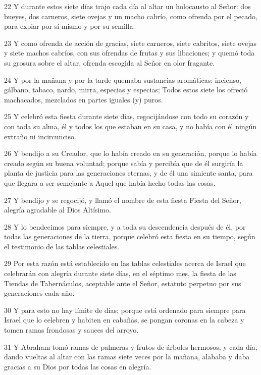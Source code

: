 \par 22 Y durante estos siete días trajo cada día al altar un holocausto al Señor: dos bueyes, dos carneros, siete ovejas y un macho cabrío, como ofrenda por el pecado, para expiar por sí mismo y por su semilla.
\par 23 Y como ofrenda de acción de gracias, siete carneros, siete cabritos, siete ovejas y siete machos cabríos, con sus ofrendas de frutas y sus libaciones; y quemó toda su grosura sobre el altar, ofrenda escogida al Señor en olor fragante.
\par 24 Y por la mañana y por la tarde quemaba sustancias aromáticas: incienso, gálbano, tabaco, nardo, mirra, especias y especias; Todos estos siete los ofreció machacados, mezclados en partes iguales (y) puros.
\par 25 Y celebró esta fiesta durante siete días, regocijándose con todo su corazón y con toda su alma, él y todos los que estaban en su casa, y no había con él ningún extraño ni incircunciso.
\par 26 Y bendijo a su Creador, que lo había creado en su generación, porque lo había creado según su buena voluntad; porque sabía y percibía que de él surgiría la planta de justicia para las generaciones eternas, y de él una simiente santa, para que llegara a ser semejante a Aquel que había hecho todas las cosas.
\par 27 Y bendijo y se regocijó, y llamó el nombre de esta fiesta Fiesta del Señor, alegría agradable al Dios Altísimo.
\par 28 Y lo bendecimos para siempre, y a toda su descendencia después de él, por todas las generaciones de la tierra, porque celebró esta fiesta en su tiempo, según el testimonio de las tablas celestiales.
\par 29 Por esta razón está establecido en las tablas celestiales acerca de Israel que celebrarán con alegría durante siete días, en el séptimo mes, la fiesta de las Tiendas de Tabernáculos, aceptable ante el Señor, estatuto perpetuo por sus generaciones cada año.
\par 30 Y para esto no hay límite de días; porque está ordenado para siempre para Israel que lo celebren y habiten en cabañas, se pongan coronas en la cabeza y tomen ramas frondosas y sauces del arroyo.
\par 31 Y Abraham tomó ramas de palmeras y frutos de árboles hermosos, y cada día, dando vueltas al altar con las ramas siete veces por la mañana, alababa y daba gracias a su Dios por todas las cosas en alegría.

